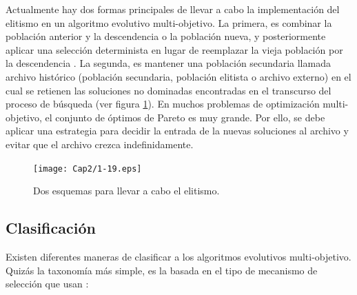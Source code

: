   Actualmente hay dos formas principales de llevar a cabo la implementaci\'on del elitismo en un algoritmo evolutivo multi-objetivo. La primera,
  es combinar la poblaci\'on anterior y la descendencia o la poblaci\'on nueva, y posteriormente aplicar una selecci\'on determinista 
  en lugar de reemplazar la vieja poblaci\'on por la descendencia \cite{deb02}. La segunda, es mantener una poblaci\'on secundaria 
  llamada archivo hist\'orico (poblaci\'on secundaria, poblaci\'on elitista o archivo externo) en el cual se retienen las soluciones no 
  dominadas encontradas en el transcurso del proceso de b\'usqueda \cite{Zitzler99}(ver figura \ref{fig:elitismo}). En muchos problemas 
  de optimizaci\'on multi-objetivo, el conjunto de \'optimos de Pareto es muy grande. Por ello, se debe aplicar una estrategia para decidir 
  la entrada de la nuevas soluciones al archivo y evitar que el archivo crezca indefinidamente.
  
    \begin{figure}[H]
	\centering
	\texttt{[image: Cap2/1-19.eps]}
	  \caption{Dos esquemas para llevar a cabo el elitismo.}
      \label{fig:elitismo}
      \end{figure}
  
  \subsection{Clasificaci\'on}
  
  Existen diferentes maneras de clasificar a los algoritmos evolutivos multi-objetivo. Quiz\'as la taxonom\'ia m\'as simple, 
  es la basada en el tipo de mecanismo de selecci\'on que usan \cite{EASMC}:
  
